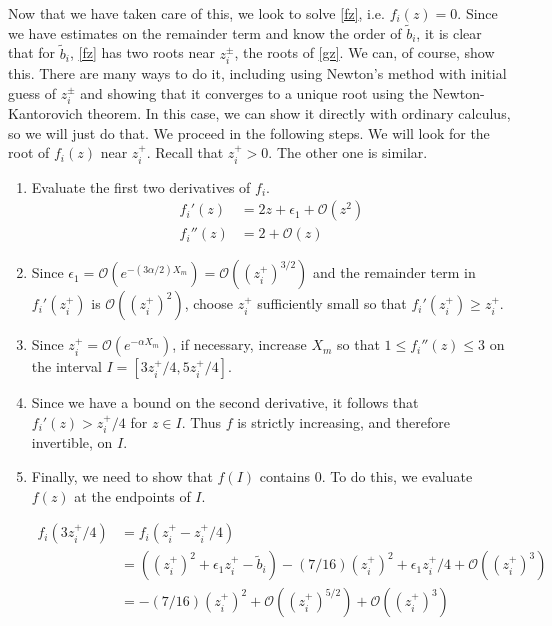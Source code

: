 \documentclass[12pt]{article}
\begin{document}
Now that we have taken care of this, we look to solve \eqref{fz}, i.e. $f_i(z) = 0$. Since we have estimates on the remainder term and know the order of $\tilde{b}_i$, it is clear that for $\tilde{b}_i$, \eqref{fz} has two roots near $z_i^\pm$, the roots of \eqref{gz}. We can, of course, show this. There are many ways to do it, including using Newton's method with initial guess of $z_i^\pm$ and showing that it converges to a unique root using the Newton-Kantorovich theorem. In this case, we can show it directly with ordinary calculus, so we will just do that. We proceed in the following steps. We will look for the root of $f_i(z)$ near $z_i^+$. Recall that $z_i^+ > 0$. The other one is similar.

\begin{enumerate}

\item Evaluate the first two derivatives of $f_i$. 
\begin{align*}
f_i'(z) &= 2z + \epsilon_1 + \mathcal{O}(z^2) \\
f_i''(z) &= 2 + \mathcal{O}(z)
\end{align*}

\item Since $\epsilon_1 = \mathcal{O}(e^{-(3 \alpha/2) X_m}) = \mathcal{O}((z_i^+)^{3/2})$ and the remainder term in $f_i'(z_i^+)$ is $\mathcal{O}((z_i^+)^2)$, choose $z_i^+$ sufficiently small so that $f_i'(z_i^+) \geq z_i^+$.

\item Since $z_i^+ = \mathcal{O}(e^{-\alpha X_m})$, if necessary, increase $X_m$ so that $1 \leq f_i''(z) \leq 3$ on the interval $I = [3 z_i^+ /4, 5 z_i^+/4]$.

\item Since we have a bound on the second derivative, it follows that $f_i'(z) > z_i^+/4$ for $z \in I$. Thus $f$ is strictly increasing, and therefore invertible, on $I$. 

\item Finally, we need to show that $f(I)$ contains 0. To do this, we evaluate $f(z)$ at the endpoints of $I$.

\begin{align*}
f_i(3 z_i^+/4) &= f_i(z_i^+ - z_i^+/4) \\
&= ((z_i^+)^2 + \epsilon_1 z_i^+ - \tilde{b}_i) - (7/16)(z_i^+)^2 
+ \epsilon_1 z_i^+/4 + \mathcal{O}((z_i^+)^3) \\
&= - (7/16)(z_i^+)^2 + \mathcal{O}((z_i^+)^{5/2}) + \mathcal{O}((z_i^+)^3)
\end{align*}


\end{enumerate}
\end{document}
